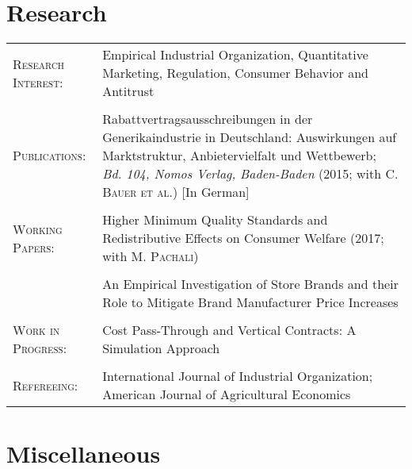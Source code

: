 \documentclass[a4paper,10pt]{article} %
\begin{document}

\section{Research}

\begin{tabular}{P{4.5cm} P{10cm}}
\textsc{Research Interest:} &  Empirical Industrial Organization, Quantitative Marketing, Regulation, Consumer Behavior and Antitrust \\
\\
\textsc{Publications:} &  Rabattvertragsausschreibungen in der Generikaindustrie in Deutschland: Auswirkungen auf Marktstruktur, Anbietervielfalt und Wettbewerb; \textit{Bd. 104, Nomos Verlag, Baden-Baden} (2015; with C. \textsc{Bauer et al.}) [In German] \\
\\
\textsc{Working Papers:} & Higher Minimum Quality Standards and Redistributive Effects on Consumer Welfare (2017; with M. \textsc{Pachali}) \\
\\
&An Empirical Investigation of Store Brands and their Role to Mitigate Brand Manufacturer Price Increases \\
\\
\textsc{Work in Progress:}  & Cost Pass-Through and Vertical Contracts: A Simulation Approach \\
\\
\textsc{Refereeing:}  & International Journal of Industrial Organization; American Journal of Agricultural Economics \\
\end{tabular}





\section{Miscellaneous}
\end{document}
